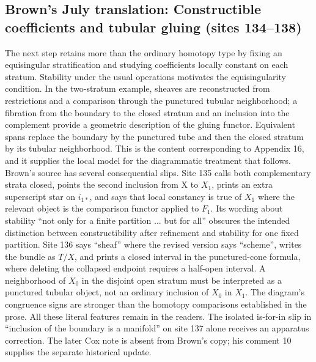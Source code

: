 \documentclass[10pt,oneside]{book}
\begin{document}
\subsection*{Brown's July translation: Constructible coefficients and tubular gluing (sites 134--138)}
The next step retains more than the ordinary homotopy type by fixing an equisingular stratification and studying coefficients locally constant on each stratum. Stability under the usual operations motivates the equisingularity condition. In the two-stratum example, sheaves are reconstructed from restrictions and a comparison through the punctured tubular neighborhood; a fibration from the boundary to the closed stratum and an inclusion into the complement provide a geometric description of the gluing functor. Equivalent spans replace the boundary by the punctured tube and then the closed stratum by its tubular neighborhood. This is the content corresponding to Appendix 16, and it supplies the local model for the diagrammatic treatment that follows. Brown's source has several consequential slips. Site 135 calls both complementary strata closed, points the second inclusion from X to $X_1$, prints an extra superscript star on $i_{1*}$, and says that local constancy is true of $X_1$ where the relevant object is the comparison functor applied to $F_1$. Its wording about stability ``not only for a finite partition ... but for all'' obscures the intended distinction between constructibility after refinement and stability for one fixed partition. Site 136 says ``sheaf'' where the revised version says ``scheme'', writes the bundle as $T/X$, and prints a closed interval in the punctured-cone formula, where deleting the collapsed endpoint requires a half-open interval. A neighborhood of $X_0$ in the disjoint open stratum must be interpreted as a punctured tubular object, not an ordinary inclusion of $X_0$ in $X_1$. The diagram's congruence signs are stronger than the homotopy comparisons established in the prose. All these literal features remain in the readers. The isolated is-for-in slip in ``inclusion of the boundary is a manifold'' on site 137 alone receives an apparatus correction. The later Cox note is absent from Brown's copy; his comment 10 supplies the separate historical update.
\end{document}
